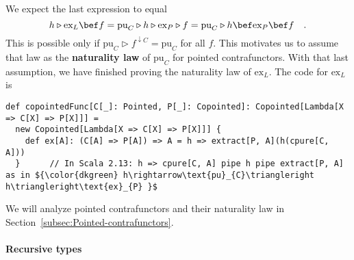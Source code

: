 We expect the last expression to equal 
\[
h\triangleright\text{ex}_{L}\bef f=\text{pu}_{C}\triangleright h\triangleright\text{ex}_{P}\triangleright f=\text{pu}_{C}\triangleright h\bef\text{ex}_{P}\bef f\quad.
\]
This is possible only if $\text{pu}_{C}\triangleright f^{\downarrow C}=\text{pu}_{C}$
for all $f$. This motivates us to assume that law as the \textbf{naturality
law} of $\text{pu}_{C}$ for pointed contrafunctors. With that last
assumption, we have finished proving the naturality law of $\text{ex}_{L}$.
The code for $\text{ex}_{L}$ is
\begin{lstlisting}[mathescape=true]
def copointedFunc[C[_]: Pointed, P[_]: Copointed]: Copointed[Lambda[X => C[X] => P[X]]] =
  new Copointed[Lambda[X => C[X] => P[X]]] {
    def ex[A]: (C[A] => P[A]) => A = h => extract[P, A](h(cpure[C, A]))
  }      // In Scala 2.13: h => cpure[C, A] pipe h pipe extract[P, A] as in ${\color{dkgreen} h\rightarrow\text{pu}_{C}\triangleright h\triangleright\text{ex}_{P} }$
\end{lstlisting}

We will analyze pointed contrafunctors and their naturality law in
Section~\ref{subsec:Pointed-contrafunctors}.

\paragraph{Recursive types}

